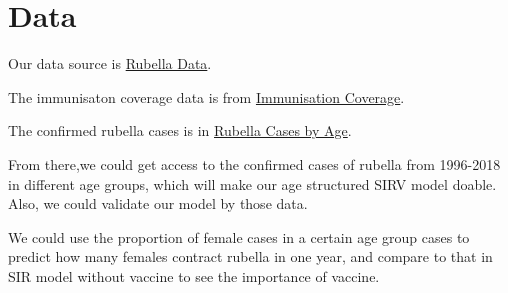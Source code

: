\documentclass{article}
\begin{document}
\section{Data}
Our data source is \href{https://webarchive.nationalarchives.gov.uk/20140505133414/http://www.hpa.org.uk/Topics/InfectiousDiseases/InfectionsAZ/Rubella/EpidemiologicalData/}{Rubella Data}.

The immunisaton coverage data is from \href{https://webarchive.nationalarchives.gov.uk/20140505192935/http://www.hpa.org.uk/web/HPAweb&HPAwebStandard/HPAweb_C/1195733819251}{Immunisation Coverage}.

The confirmed rubella cases is in \href{https://webarchive.nationalarchives.gov.uk/20140505195855/http://www.hpa.org.uk/web/HPAweb&HPAwebStandard/HPAweb_C/1195733752351}{Rubella Cases by Age}.


From there,we could get access to the confirmed cases of rubella from 1996-2018 in different age groups, which will make our age structured SIRV model doable. Also, we could validate our model by those data.

We could use the proportion of female cases in a certain age group cases to predict how many females contract rubella in one year, and compare to that in SIR model without vaccine to see the importance of vaccine.
\end{document}

